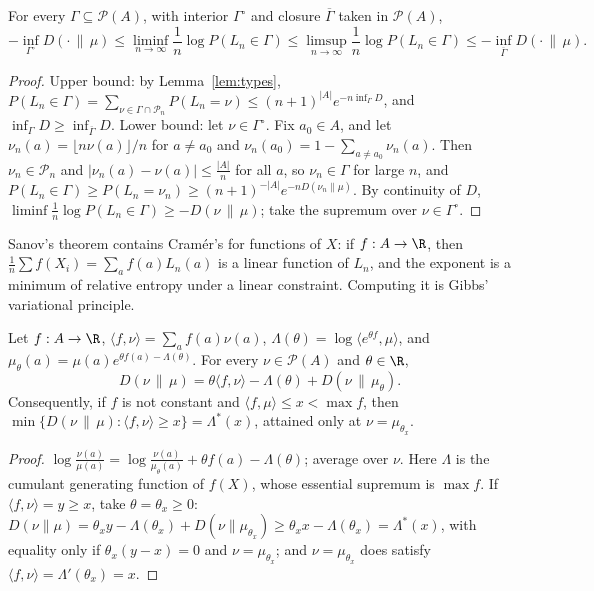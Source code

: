 \begin{theorem}\label{thm:sanov}
For every $\Gamma\subseteq\mathcal P(A)$, with interior $\Gamma^\circ$ and closure $\overline\Gamma$ taken in $\mathcal P(A)$,
\[
-\inf_{\Gamma^\circ}D(\cdot\,\|\,\mu)\le\liminf_{n\to\infty}\frac1n\log P(L_n\in\Gamma)\le\limsup_{n\to\infty}\frac1n\log P(L_n\in\Gamma)\le-\inf_{\overline\Gamma}D(\cdot\,\|\,\mu).
\]
\end{theorem}
\begin{proof}
Upper bound: by Lemma~\ref{lem:types}, $P(L_n\in\Gamma)=\sum_{\nu\in\Gamma\cap\mathcal P_n}P(L_n=\nu)\le(n+1)^{|A|}e^{-n\inf_\Gamma D}$, and $\inf_\Gamma D\ge\inf_{\overline\Gamma}D$.
Lower bound: let $\nu\in\Gamma^\circ$. Fix $a_0\in A$, and let $\nu_n(a)=\lfloor n\nu(a)\rfloor/n$ for $a\ne a_0$ and $\nu_n(a_0)=1-\sum_{a\ne a_0}\nu_n(a)$. Then $\nu_n\in\mathcal P_n$ and
$|\nu_n(a)-\nu(a)|\le\frac{|A|}n$ for all $a$, so $\nu_n\in\Gamma$ for large $n$, and $P(L_n\in\Gamma)\ge P(L_n=\nu_n)\ge(n+1)^{-|A|}e^{-nD(\nu_n\|\mu)}$. By continuity of $D$,
$\liminf\frac1n\log P(L_n\in\Gamma)\ge-D(\nu\,\|\,\mu)$; take the supremum over $\nu\in\Gamma^\circ$.
\end{proof}

Sanov's theorem contains Cram\'er's for functions of $X$: if $f:A\to\R$, then $\frac1n\sum f(X_i)=\sum_af(a)L_n(a)$ is a linear function of $L_n$, and the exponent is a
minimum of relative entropy under a linear constraint. Computing it is Gibbs' variational principle.

\begin{proposition}\label{prop:gibbsvar}
Let $f:A\to\R$, $\langle f,\nu\rangle=\sum_af(a)\nu(a)$, $\Lambda(\theta)=\log\langle e^{\theta f},\mu\rangle$, and $\mu_\theta(a)=\mu(a)e^{\theta f(a)-\Lambda(\theta)}$. For every $\nu\in\mathcal P(A)$ and $\theta\in\R$,
\[
D(\nu\,\|\,\mu)=\theta\langle f,\nu\rangle-\Lambda(\theta)+D(\nu\,\|\,\mu_\theta).
\]
Consequently, if $f$ is not constant and $\langle f,\mu\rangle\le x<\max f$, then $\min\{D(\nu\,\|\,\mu):\langle f,\nu\rangle\ge x\}=\Lambda^*(x)$, attained only at $\nu=\mu_{\theta_x}$.
\end{proposition}
\begin{proof}
$\log\frac{\nu(a)}{\mu(a)}=\log\frac{\nu(a)}{\mu_\theta(a)}+\theta f(a)-\Lambda(\theta)$; average over $\nu$. Here $\Lambda$ is the cumulant generating function of $f(X)$, whose essential
supremum is $\max f$. If $\langle f,\nu\rangle=y\ge x$, take $\theta=\theta_x\ge0$: $D(\nu\|\mu)=\theta_xy-\Lambda(\theta_x)+D(\nu\|\mu_{\theta_x})\ge\theta_xx-\Lambda(\theta_x)=\Lambda^*(x)$, with
equality only if $\theta_x(y-x)=0$ and $\nu=\mu_{\theta_x}$; and $\nu=\mu_{\theta_x}$ does satisfy $\langle f,\nu\rangle=\Lambda'(\theta_x)=x$.
\end{proof}

